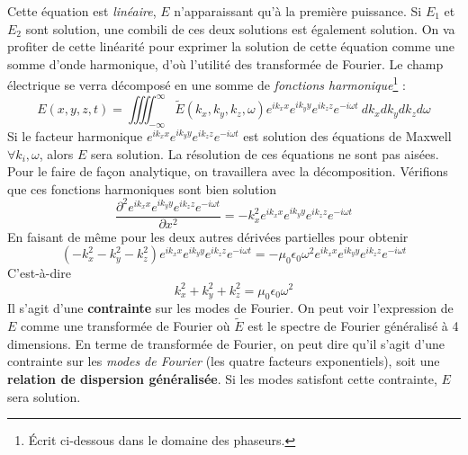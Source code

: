 Cette équation est \textit{linéaire}, $E$ n'apparaissant qu'à la première puissance. Si $E_1$ et 
$E_2$ sont solution, une combili de ces deux solutions est également solution. On va profiter 
de cette linéarité pour exprimer la solution de cette équation comme une somme d'onde harmonique, 
d'où l'utilité des transformée de Fourier. Le champ électrique se verra décomposé en une somme 
de \textit{fonctions harmonique}\footnote{Écrit ci-dessous dans le domaine des phaseurs.} :
\begin{equation}
E(x,y,z,t) = \iiiint_{-\infty}^\infty \tilde{E}(k_x,k_y,k_z,\omega)e^{ik_xx}e^{ik_yy}e^{ik_zz}
e^{-i\omega t}\ dk_xdk_ydk_zd\omega
\end{equation}
Si le facteur harmonique $e^{ik_xx}e^{ik_yy}e^{ik_zz}e^{-i\omega t}$  est solution des équations 
de Maxwell $\forall k_i,\omega$, alors $E$ sera solution. La résolution de ces équations ne sont 
pas aisées. Pour le faire de façon analytique, on travaillera avec la décomposition. Vérifions 
que ces fonctions harmoniques sont bien solution
\begin{equation}
\dfrac{\partial^2 e^{ik_xx}e^{ik_yy}e^{ik_zz}e^{-i\omega t}}{\partial x^2} = -k_x^2 e^{ik_xx}e^{ik_yy}
e^{ik_zz}e^{-i\omega t}
\end{equation}
En faisant de même pour les deux autres dérivées partielles pour obtenir
\begin{equation}
(-k_x^2-k_y^2-k_z^2)e^{ik_xx}e^{ik_yy}e^{ik_zz}e^{-i\omega t} = -\mu_0\epsilon_0\omega^2 
e^{ik_xx}e^{ik_yy}e^{ik_zz}e^{-i\omega t}
\end{equation}
C'est-à-dire
\begin{equation}
k_x^2+k_y^2+k_z^2 = \mu_0\epsilon_0\omega^2
\end{equation}
Il s'agit d'une \textbf{contrainte} sur les modes de Fourier. On peut voir l'expression de $E$ 
comme une transformée de Fourier où $\tilde{E}$ est le spectre de Fourier généralisé à 4 
dimensions. En terme de transformée de Fourier, on peut dire qu'il s'agit d'une contrainte 
sur les \textit{modes de Fourier} (les quatre facteurs exponentiels), soit une \textbf{relation 
de dispersion généralisée}. Si les modes satisfont cette contrainte, $E$ sera solution.\\

